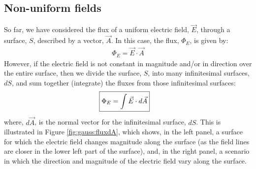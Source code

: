 \subsection{Non-uniform fields}
So far, we have considered the flux of a uniform electric field, $\vec E$, through a surface, $S$, described by a vector, $\vec A$. In this case, the flux, $\Phi_E$, is given by:
\begin{align*}
\Phi_E=\vec E\cdot \vec A
\end{align*}
However, if the electric field is not constant in magnitude and/or in direction over the entire surface, then we divide the surface, $S$, into many infinitesimal surfaces, $dS$, and sum together (integrate) the fluxes from those infinitesimal surfaces:
\begin{align*}
\Aboxed{\Phi_E=\int \vec E\cdot d\vec A}
\end{align*}
where, $d\vec A$, is the normal vector for the infinitesimal surface, $dS$. This is illustrated in Figure \ref{fig:gauss:fluxdA}, which shows, in the left panel, a surface for which the electric field changes magnitude along the surface (as the field lines are closer in the lower left part of the surface), and, in the right panel, a scenario in which the direction and magnitude of the electric field vary along the surface.

